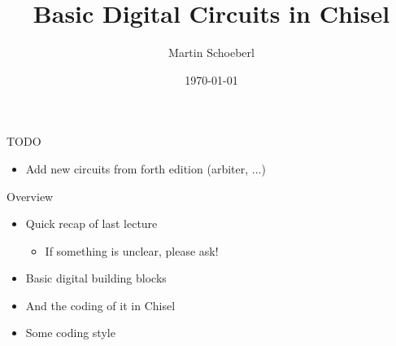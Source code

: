 

\newif\ifbook



\title{Basic Digital Circuits in Chisel}
\author{Martin Schoeberl}
\date{\today}



\begin{frame}
\titlepage
\end{frame}

\begin{frame}[fragile]{TODO}
\begin{itemize}
\item Add new circuits from forth edition (arbiter, ...)
\end{itemize}
\end{frame}


\begin{frame}[fragile]{Overview}
\begin{itemize}
\item Quick recap of last lecture
\begin{itemize}
\item If something is unclear, please ask!
\end{itemize}
\item Basic digital building blocks
\item And the coding of it in Chisel
\item Some coding style
\end{itemize}
\end{frame}

